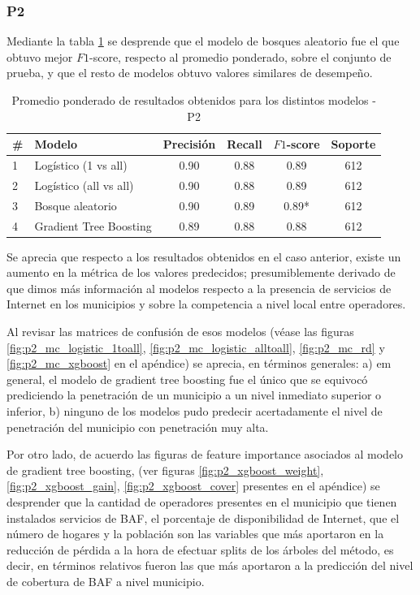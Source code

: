\documentclass[9pt,twocolumn,twoside]{ilcss}
\begin{document}
\subsubsection{P2}

Mediante la tabla \ref{tab:p2_results} se desprende que el modelo de bosques aleatorio fue el que obtuvo mejor $F1$-score, respecto al promedio ponderado, sobre el conjunto de prueba, y que el resto de modelos obtuvo valores similares de desempeño.

\begin{table}[tbhp]
	\centering
	\caption{Promedio ponderado de resultados obtenidos para los distintos modelos - P2}
	\label{tab:p2_results}
	\begin{tabular}{@{}llcccc@{}}
		\toprule
		\# & Modelo & \multicolumn{1}{l}{Precisión} & \multicolumn{1}{l}{Recall} & \multicolumn{1}{l}{$F1$-score} & \multicolumn{1}{l}{Soporte} \\ \midrule
		1 & Logístico (1 vs all) & 0.90 & 0.88 & 0.89 & 612 \\
		2 & Logístico (all vs all) & 0.90 & 0.88 & 0.89 & 612 \\
		3 & Bosque aleatorio & 0.90 & 0.89 & 0.89* & 612 \\
		4 & Gradient Tree Boosting & 0.89 & 0.88 & 0.88 & 612 \\ \bottomrule
	\end{tabular}
\end{table}

Se aprecia que respecto a los resultados obtenidos en el caso anterior, existe un aumento en la métrica de los valores predecidos; presumiblemente derivado de que dimos más información al modelos respecto a la presencia de servicios de Internet en los municipios y sobre la competencia a nivel local entre operadores.

Al revisar las matrices de confusión de esos modelos (véase las figuras \ref{fig:p2_mc_logistic_1toall}, \ref{fig:p2_mc_logistic_alltoall}, \ref{fig:p2_mc_rd} y \ref{fig:p2_mc_xgboost} en el apéndice) se aprecia, en términos generales: a) em general, el modelo de gradient tree boosting fue el único que se equivocó prediciendo la penetración de un municipio a un nivel inmediato superior o inferior, b) ninguno de los modelos pudo predecir acertadamente el nivel de penetración del municipio con penetración muy alta.

Por otro lado, de acuerdo las figuras de feature importance asociados al modelo de gradient tree  boosting, (ver figuras \ref{fig:p2_xgboost_weight}, \ref{fig:p2_xgboost_gain}, \ref{fig:p2_xgboost_cover} presentes en el apéndice) se desprender que la cantidad de operadores presentes en el municipio que tienen instalados servicios de BAF, el porcentaje de disponibilidad de Internet, que el número de hogares y la población son las variables que más aportaron en la reducción de pérdida a la hora de efectuar splits de los árboles del método, es decir, en términos relativos fueron las que más aportaron a la predicción del nivel de cobertura de BAF a nivel municipio.
\end{document}
